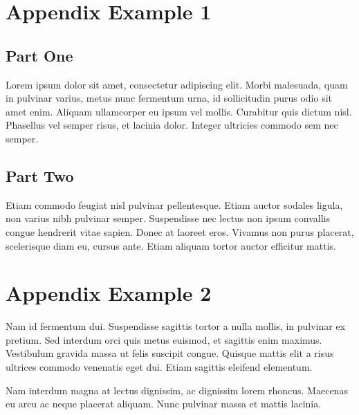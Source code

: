 \section{Appendix Example 1}

\subsection{Part One}
Lorem ipsum dolor sit amet, consectetur adipiscing elit. Morbi malesuada, quam in pulvinar varius, metus nunc fermentum urna, id sollicitudin purus odio sit amet enim. Aliquam ullamcorper eu ipsum vel mollis. Curabitur quis dictum nisl. Phasellus vel semper risus, et lacinia dolor. Integer ultricies commodo sem nec semper.

\subsection{Part Two}
Etiam commodo feugiat nisl pulvinar pellentesque. Etiam auctor sodales ligula, non varius nibh pulvinar semper. Suspendisse nec lectus non ipsum convallis congue hendrerit vitae sapien. Donec at laoreet eros. Vivamus non purus placerat, scelerisque diam eu, cursus ante. Etiam aliquam tortor auctor efficitur mattis.

\section{Appendix Example 2}
Nam id fermentum dui. Suspendisse sagittis tortor a nulla mollis, in pulvinar ex pretium. Sed interdum orci quis metus euismod, et sagittis enim maximus. Vestibulum gravida massa ut felis suscipit congue. Quisque mattis elit a risus ultrices commodo venenatis eget dui. Etiam sagittis eleifend elementum.

Nam interdum magna at lectus dignissim, ac dignissim lorem rhoncus. Maecenas eu arcu ac neque placerat aliquam. Nunc pulvinar massa et mattis lacinia.



